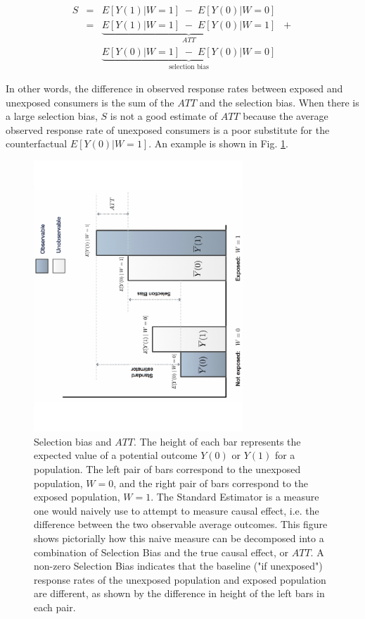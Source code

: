 \documentclass[11pt,a4paper]{article}
\theoremstyle{definition}
\theoremstyle{remark}
\theoremstyle{definition}
\theoremstyle{definition}
\theoremstyle{definition}
\theoremstyle{definition}
\theoremstyle{definition}
\theoremstyle{definition}
\begin{document}
\begin{eqnarray*}
S &= & E[ Y(1) | W = 1]  \; -  \; E[ Y(0) | W = 0 ] \\
  &= & \underbrace{E[ Y(1) | W = 1]  \; -  \; E[ Y(0) | W = 1 ]}_{ATT} \; \; + \\ 
  &  & \underbrace{E[ Y(0) | W = 1]  \; -  \; E[ Y(0) | W = 0 ]}_{\text{selection bias}}  
\end{eqnarray*}

In other words, the difference in observed response rates between exposed and unexposed consumers is the sum of the $ATT$ and the selection bias. 
When there is a large selection bias, $S$ is not a good estimate of $ATT$ because the average observed response rate of unexposed consumers is a poor substitute for the counterfactual $E[ Y(0)|W=1 ]$. An example is shown in Fig. \ref{fig-att-bias}.

\begin{figure}\centering
\includegraphics[width=0.7\textwidth,angle=270]{selection-bias.pdf}
\caption{\small Selection bias and $ATT$. The height of each bar represents the expected value of a potential outcome $Y(0)$ or $Y(1)$ for a population.
 The left pair of bars correspond to the unexposed population, $W=0$, and the right pair of bars correspond to the exposed population, $W=1$. 
 The Standard Estimator is a measure one would naively use to attempt to measure causal effect, i.e. the difference between the two observable average outcomes. 
 This figure shows pictorially how this naive measure can be decomposed into a combination of Selection Bias and the true causal effect, or $ATT$.
 A non-zero Selection Bias indicates that the baseline ("if unexposed") response rates of the unexposed population and exposed population are different, as shown by the difference in height of the left bars in each pair.}\label{fig-att-bias}
\end{figure}
\end{document}

